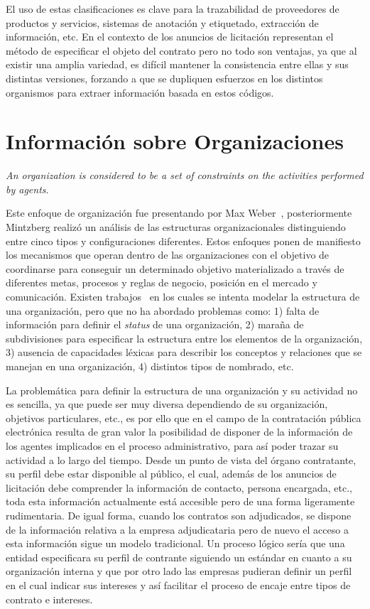 El uso de estas clasificaciones es clave para la trazabilidad de proveedores de productos y servicios,
sistemas de anotación y etiquetado, extracción de información, etc. En el contexto de los anuncios
de licitación representan el método de especificar el objeto del contrato pero no todo
son ventajas, ya que al existir una amplia variedad, es difícil mantener la consistencia entre ellas
y sus distintas versiones, forzando a que se dupliquen esfuerzos en los distintos organismos para 
extraer información basada en estos códigos. 



\section{Información sobre Organizaciones}
\textit{An organization is considered to be a set of constraints on the activities performed by agents}. 

Este enfoque de organización fue presentando por Max Weber~\cite{Weber1978}, posteriormente Mintzberg realizó un análisis
de las estructuras organizacionales distinguiendo entre cinco tipos y configuraciones diferentes. Estos enfoques
ponen de manifiesto los mecanismos que operan dentro de las organizaciones con el objetivo
de coordinarse para conseguir un determinado objetivo materializado a través de diferentes metas,
procesos y reglas de negocio, posición en el mercado y comunicación. Existen trabajos~\cite{Fox95anorganisation}
en los cuales se intenta modelar la estructura de una organización, pero que no ha abordado problemas como:
1) falta de información para definir el \textit{status} de una organización, 2) maraña de subdivisiones
para especificar la estructura entre los elementos de la organización, 3) ausencia de capacidades léxicas
para describir los conceptos y relaciones que se manejan en una organización, 4) distintos tipos
de nombrado, etc. 

La problemática para definir la estructura de una organización y su actividad no es sencilla, ya que puede
ser muy diversa dependiendo de su organización, objetivos particulares, etc., es por ello que en el campo
de la contratación pública electrónica resulta de gran valor la posibilidad de disponer de la información
de los agentes implicados en el proceso administrativo, para así poder trazar su actividad a lo largo
del tiempo. Desde un punto de vista del órgano contratante, su perfil debe estar disponible al público, el cual, 
además de los anuncios de licitación debe comprender la información de contacto, persona encargada, etc., 
toda esta información actualmente está accesible pero de una forma ligeramente rudimentaria. De igual forma, cuando
los contratos son adjudicados, se dispone de la información relativa a la empresa adjudicataria pero de nuevo
el acceso a esta información sigue un modelo tradicional. Un proceso lógico sería que una entidad especificara
su perfil de contrante siguiendo un estándar en cuanto a su organización interna y que por otro lado
las empresas pudieran definir un perfil en el cual indicar sus intereses y así facilitar el proceso de 
encaje entre tipos de contrato e intereses. 

